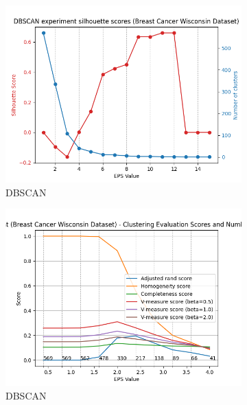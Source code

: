 \documentclass[12pt]{article}
\begin{document}
\begin{figure}[H]
\begin{subfigure}[t]{0.19\textwidth}
        \includegraphics[width=\linewidth]{img/other_datasets/cancer_dbscan_silhouette.png}
        \caption{DBSCAN}
    \end{subfigure}
    \hfill
    \begin{subfigure}[t]{0.19\textwidth}
        \includegraphics[width=\linewidth]{img/other_datasets/cancer_dbscan_scores.png}
        \caption{DBSCAN}
    \end{subfigure}
    \hfill
    \begin{subfigure}[t]{0.19\textwidth}

\end{subfigure}
\end{figure}
\end{document}
